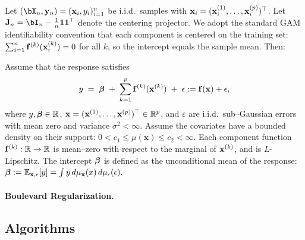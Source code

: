 	Let $(\bX_n, \by_n) = (\bx_i,y_i)_{i=1}^n$ be i.i.d.\ samples with $\mathbf{x}_i=(\mathbf{x}_i^{(1)},\ldots,\mathbf{x}_i^{(p)})^\top$. Let $\jmat=\bI_n-\frac{1}{n}\bone\bone^\top$ denote the centering projector. We adopt the standard GAM identifiability convention that each component is centered on the training set: $\sum_{i=1}^n \mathbf{f}^{(k)}(\mathbf{x}_i^{(k)})=0$ for all $k$, so the intercept equals the sample mean. Then:
	\begin{assumption}
		\label{aspt:truth}
		Assume that the response satisfies
		$$
		y \;=\; \bm{\beta} \;+\; \sum_{k=1}^p \mathbf{f}^{(k)}(\mathbf{x}^{(k)}) \;+\; \epsilon : = \mathbf{f}(\mathbf{x}) + \epsilon,
		$$
		where $y, \bm{\beta} \in\mathbb{R}$, $\mathbf{x}=(\mathbf{x}^{(1)},\dots,\mathbf{x}^{(p)})^\top\in\mathbb{R}^p$, and $\varepsilon$ are i.i.d.\ sub--Gaussian errors with mean zero and variance $\sigma^2<\infty$.  
		Assume the covariates have a bounded density on their support: $0<c_1\leq \mu(\mathbf{x}) \leq c_2<\infty$.  Each component function $\mathbf{f}^{(k)}:\mathbb{R}\to\mathbb{R}$ is mean--zero with respect to the marginal of $\mathbf{x}^{(k)}$, and is $L$-Lipschitz. The intercept $\bm{\beta}$ is defined as the unconditional mean of the response: $\bm{\beta} := \mathbb{E}_{\mathbf{x}, \epsilon}[y] = \int y \, d\mu_{\mathbf{x}}(x)\, d\mu_\epsilon(\epsilon).$
	\end{assumption}
	
	\paragraph{Boulevard Regularization.} 

	\subsection{Algorithms} \label{ch06b:sec:algorithms}
    
